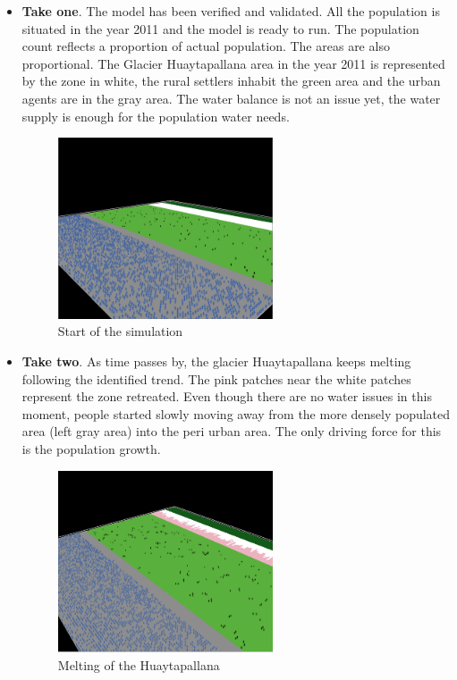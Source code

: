 \documentclass{article}
\begin{document}
\begin{itemize}
\item {\bf Take one}. The model has been verified and validated. All the population is situated in the year 2011 and the model is ready to run. The population count reflects a proportion of actual population. The areas are also proportional. The Glacier Huaytapallana area in the year 2011 is represented by the zone in white, the rural settlers inhabit the green area and the urban agents are in the gray area. The water balance is not an issue yet, the water supply is enough for the population water needs. 

\begin{figure}[h]
  \centering
  \includegraphics[width=0.6\textwidth]{esc1}
  \caption{Start of the simulation}
  \label{network}
\end{figure}

\item {\bf Take two}. As time passes by, the glacier Huaytapallana keeps melting following the identified trend. The pink patches near the white patches represent the zone retreated. Even though there are no water issues in this moment, people started slowly moving away from the more densely populated area (left gray area) into the peri urban area. The only driving force for this is the population growth. 

\begin{figure}[h]
  \centering
  \includegraphics[width=0.6\textwidth]{esc2}
  \caption{Melting of the Huaytapallana}
  \label{network}
\end{figure}


\end{itemize}
\end{document}
